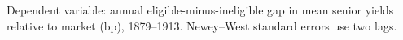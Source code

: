 Dependent variable: annual eligible-minus-ineligible gap in mean senior yields relative to market (bp), 1879--1913. Newey--West standard errors use two lags.
